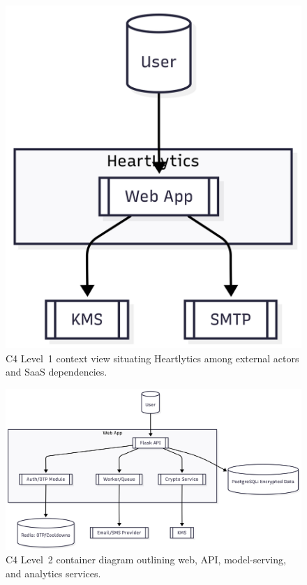 \documentclass[conference]{IEEEtran}
\begin{document}
\begin{figure}[t]
  \centering
  \includegraphics[width=0.9\linewidth]{c4_level_1_context.png}
  \caption{C4 Level~1 context view situating Heartlytics among external actors and SaaS dependencies.}
  \label{fig:c4_context}
\end{figure}

\begin{figure}[t]
  \centering
  \includegraphics[width=0.9\linewidth]{c4_level_2_containers.png}
  \caption{C4 Level~2 container diagram outlining web, API, model-serving, and analytics services.}
  \label{fig:c4_containers}
\end{figure}
\end{document}
